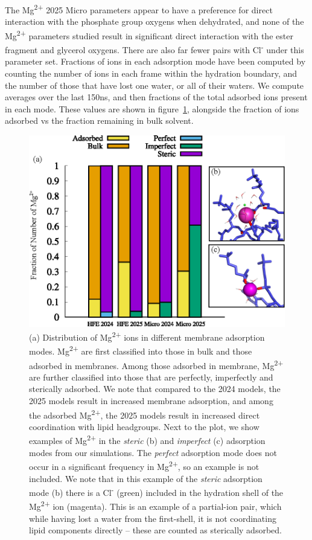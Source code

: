 \documentclass[journal=langd5,manuscript=article]{achemso}
\newcommand{\mg}{Mg\textsuperscript{2+}}
\newcommand{\cl}{Cl\textsuperscript{-}}
\begin{document}
The \mg{ 2025} Micro parameters appear to have a preference for direct interaction with the phosphate group oxygens when dehydrated, and none of the \mg{} parameters studied result in significant direct interaction with the ester fragment and glycerol oxygens. There are also far fewer pairs with \cl{} under this parameter set.
Fractions of ions in each adsorption mode have been computed by counting the number of ions in each frame within the hydration boundary, 
and the number of those that have lost one water, or all of their waters. We compute averages over the last 150ns, and then 
fractions of the total adsorbed ions present in each mode. These values are shown in figure~\ref{fig:adfrac}, alongside the fraction of ions adsorbed vs the fraction remaining in bulk solvent. 
\begin{figure}[H]
    \caption{ (a) Distribution of \mg{} ions in different membrane adsorption modes. \mg{} are first classified into those in bulk and those adsorbed in membranes. 
        Among those adsorbed in membrane, \mg{} are 
        further classified into those that are perfectly, imperfectly and sterically adsorbed. 
        We note that compared to the 2024 models, the 2025 models result in increased membrane adsorption, 
        and among the adsorbed \mg{}, the 2025 models result in increased direct coordination with lipid headgroups. Next to the plot, we show examples of \mg{} in the \emph{steric} (b) and \emph{imperfect} (c) 
        adsorption modes from our simulations. The \emph{perfect} adsorption mode does not occur in a significant frequency in \mg{}, so an example is not included. We note that
    in this example of the \emph{steric} adsorption mode (b) there is a \cl{} (green) included in the hydration shell of the \mg{} ion (magenta). This is an example of a partial-ion
pair, which while having lost a water from the first-shell, it is not coordinating lipid components directly -- these are counted as sterically adsorbed.}
    \label{fig:adfrac}
    \includegraphics[height=0.5\textheight]{../figures/Figure_3.eps}
\end{figure}
\end{document}
